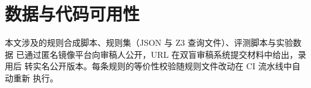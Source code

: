 \label{sec:availability}
\section*{数据与代码可用性}

本文涉及的规则合成脚本、规则集（JSON 与 Z3 查询文件）、评测脚本与实验数据
已通过匿名镜像平台向审稿人公开，URL 在双盲审稿系统提交材料中给出，录用后
转实名公开版本。每条规则的等价性校验随规则文件改动在 CI 流水线中自动重新
执行。
